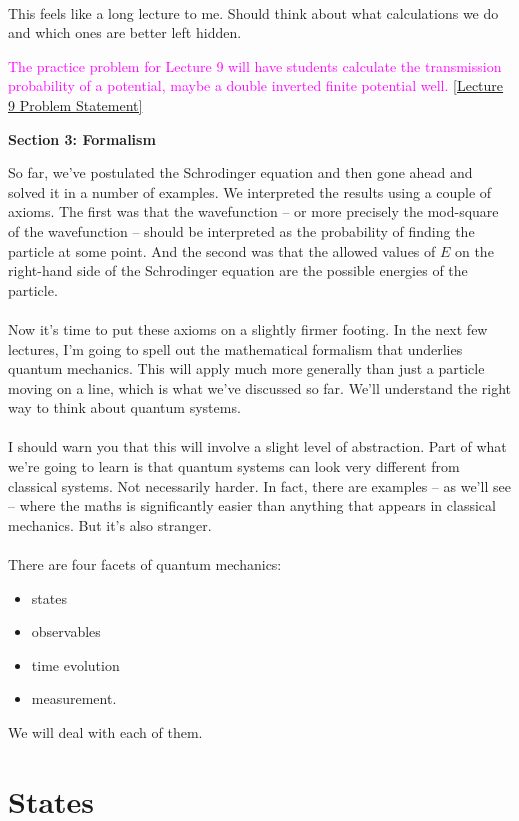 \documentclass[12pt]{article}
\newcommand\para{\paragraph{}}
\newcommand{\co}{\color{olive}}
\newcommand{\cred}{\color{red}}
\newcommand{\alyssa}{\textcolor{magenta}}
\begin{document}
\para
{\cred This feels like a long lecture to me. Should think about what calculations we do and which ones are better left hidden.}

\alyssa{The practice problem for Lecture 9 will have students calculate the transmission probability of a potential, maybe a double inverted finite potential well.} \href{https://drive.google.com/file/d/1X81MIar2-dtrg2-fvZegfL0MSUJrpkav/view?usp=drive_link}{[Lecture 9 Problem Statement]}



\newpage
\noindent
{\Large \bf Section 3: Formalism}

\vskip 3mm

So far, we've postulated the Schrodinger equation and then gone ahead and solved it in a number of examples. We interpreted the results using a couple of axioms. The first was that the wavefunction -- or more precisely the mod-square of the wavefunction -- should be interpreted as the probability of finding the particle at some point. And the second was that the allowed values of $E$ on the right-hand side of the Schrodinger equation are the possible energies of the particle.

\para
Now it's time to put these axioms on a slightly firmer footing. In the next few lectures, I'm going to spell out the mathematical formalism that underlies quantum mechanics. This will apply much more generally than just a particle moving on a line, which is what we've discussed so far. We'll understand the right way to think about quantum systems. 

\para
I should warn you that this will involve a slight level of abstraction. Part of what we're going to learn is that quantum systems can look very different from classical systems. Not necessarily harder. In fact, there are examples -- as we'll see -- where the maths is significantly easier than anything that appears in classical mechanics. But it's also stranger. 

\para
{\co There are four facets of quantum mechanics: 
%
\begin{itemize}
\item states \vskip 2mm
\item observables \vskip 2mm
\item time evolution \vskip 2mm
\item measurement. \vskip 2mm
\end{itemize}
%
We will deal with each of them.}




\section{States}
\end{document}
